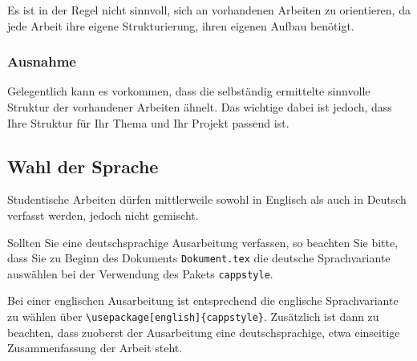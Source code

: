 Es ist in der Regel nicht sinnvoll, sich an vorhandenen Arbeiten zu orientieren, da jede Arbeit ihre eigene Strukturierung, ihren eigenen Aufbau benötigt.

\subsubsection{Ausnahme}

Gelegentlich kann es vorkommen, dass die selbständig ermittelte sinnvolle Struktur der vorhandener Arbeiten ähnelt. Das wichtige dabei ist jedoch, dass Ihre Struktur für Ihr Thema und Ihr Projekt passend ist.

\subsection{Wahl der Sprache}

Studentische Arbeiten dürfen mittlerweile sowohl in Englisch als auch in Deutsch verfasst werden, jedoch nicht gemischt.

Sollten Sie eine deutschsprachige Ausarbeitung verfassen, so beachten Sie bitte, dass Sie zu Beginn des Dokuments \verb|Dokument.tex| die deutsche Sprachvariante auswählen bei der Verwendung des Pakets \verb|cappstyle|.

Bei einer englischen Ausarbeitung ist entsprechend die englische Sprachvariante zu wählen über \verb|\usepackage[english]{cappstyle}|.
Zusätzlich ist dann zu beachten, dass zuoberst der Ausarbeitung eine deutschsprachige, etwa einseitige Zusammenfassung der Arbeit steht.
